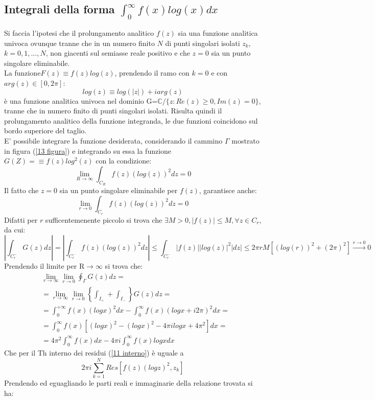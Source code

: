 \documentclass[twoside]{article}
\begin{document}
\subsection{Integrali della forma \texorpdfstring{$\int_0^\infty f(x)log(x)dx$}{Lg}}
Si faccia l'ipotesi che il prolungamento analitico $f(z)$ sia una funzione analitica univoca ovunque tranne che in un numero finito $N$ di punti singolari isolati $z_k$, $k=0,1,...,N$, non giacenti sul semiasse reale positivo e che $z=0$ sia un punto singolare eliminabile.\\
La funzione$ F(z)\equiv f(z)log(z)$, prendendo il ramo con $k=0$ e con $arg(z)\in[0,2\pi]$:
\begin{equation}
    log(z)\equiv log(|z|)+iarg(z)
\end{equation}
è una funzione analitica univoca nel dominio G=$\mathds{C}/\{z:Re(z)\ge0,Im(z)=0\}$, tranne che in numero finito di punti singolari isolati. Risulta quindi il prolungamento analitico della funzione integranda, le due funzioni coincidono sul bordo superiore del taglio.\\
E' possibile integrare la funzione desiderata, considerando il cammino $\Gamma$ mostrato in figura (\ref{13 figura}) e integrando su essa la funzione $G(Z)=\equiv f(z)log^2(z)$ con la condizione:
\begin{equation}
    \lim_{R\to\infty}\int_{C_R}f(z)(log(z))^2dz=0
\end{equation}
Il fatto che $z=0$ sia un punto singolare eliminabile per $f(z)$, garantisce anche:
\begin{equation}
    \lim_{r\to0}\int_{C_r}f(z)(log(z))^2 dz =0
\end{equation}
Difatti per $r$ sufficentemenente piccolo si trova che $\exists M>0, |f(z)|\le M,\forall z\in C_r$, da cui:
\begin{equation}
    \left|\int_{C_r^-}G(z)dz \right|=\left| \int_{C_r^-}f(z)(log(z))^2 dz\right|\le \int_{C_r^-}|f(z)||log(z)|^2|dz|\le 2\pi r M [(log(r))^2+(2\pi)^2]\xrightarrow{r\to 0} 0
\end{equation}
Prendendo il limite per R$\to\infty$ si trova che:
\begin{align}
    & \lim_{r\to \infty}\lim_{r\to 0}\oint_\Gamma G(z)dz= \\
    &=\lim_{r\to \infty}\lim_{r\to 0}\left\{ \int_{I_+}+\int_{I_-} \right\}G(z)dz = \\
    &= \int_0^{+\infty}f(x)(logx)^2dx-\int_0^{\infty}f(x)(logx+i2\pi)^2 dx=\\
    &= \int_0^\infty f(x)[(logx)^2-(logx)^2-4\pi i logx + 4\pi^2]dx= \\
    &=4\pi^2\int_0^\infty f(x)dx-4\pi i \int_0^\infty f(x)logx dx
\end{align}
Che per il Th interno dei residui (\ref{11 interno}) è uguale a
\[
2\pi i \sum_{k=1}^N Res[f(z)(logz)^2,z_k]
\]
Prendendo ed eguagliando le parti reali e immaginarie della relazione trovata si ha:
\end{document}
